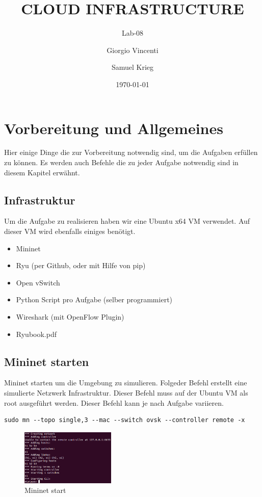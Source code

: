 \documentclass[a4,12pt]{scrartcl}
\title{CLOUD INFRASTRUCTURE}
\subtitle{Lab-08}
\author{Giorgio Vincenti \and Samuel Krieg}
\date{\today}
\begin{document}
\clearpage\maketitle
\thispagestyle{empty}
\tableofcontents
\newpage

\section{Vorbereitung und Allgemeines}
Hier einige Dinge die zur Vorbereitung notwendig sind, um die Aufgaben erfüllen zu können. Es werden auch Befehle die zu jeder Aufgabe notwendig sind in diesem Kapitel erwähnt. 

\subsection{Infrastruktur}
Um die Aufgabe zu realisieren haben wir eine Ubuntu x64 VM verwendet. 
Auf dieser VM wird ebenfalls einiges benötigt. 
\begin{itemize}
\item Mininet 
\item Ryu (per Github, oder mit Hilfe von pip) 
\item Open vSwitch
\item Python Script pro Aufgabe (selber programmiert) 
\item Wireshark (mit OpenFlow Plugin)
\item Ryubook.pdf 
\end{itemize}

\subsection{Mininet starten}
Mininet starten um die Umgebung zu simulieren. Folgeder Befehl erstellt eine simulierte Netzwerk Infrastruktur. Dieser Befehl muss auf der Ubuntu VM als root ausgeführt werden. Dieser Befehl kann je nach Aufgabe variieren. 
\begin{lstlisting}
sudo mn --topo single,3 --mac --switch ovsk --controller remote -x
\end{lstlisting}
\begin{figure} [H]
	\begin{center}
	\includegraphics[width=0.40\textwidth]{./pictures/mininet.png}
	\caption{Mininet start}
	\label{x}
	\end{center}
\end{figure} 
\end{document}
